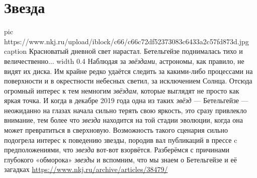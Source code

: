  
 
 
 
 
\chapter{Звезда}
\label{sec:slova.zvezda}

\ifcmt
  pic https://www.nkj.ru/upload/iblock/c66/c66c72df52373083c6433a2c57fd873d.jpg
	caption Красноватый дневной свет нарастал. Бетельгейзе поднималась тихо и величественно... 
	width 0.4
\fi
Наблюдая за \emph{звёздами}, астрономы, как правило, не видят их диска. Им
крайне редко удаётся следить за какими-либо процессами на поверхности и в
окрестности небесных светил, за исключением Солнца. Отсюда огромный интерес к
тем немногим \emph{звёздам}, которые выглядят не просто как яркая точка. И
когда в декабре 2019 года одна из таких \emph{звёзд} — Бетельгейзе — неожиданно
на глазах начала сильно терять свою яркость, это сразу привлекло внимание, тем
более что \emph{звезда} находится на той стадии эволюции, когда она может
превратиться в сверхновую. Возможность такого сценария сильно подогрела интерес
к поведению звезды, породив вал публикаций в прессе c предположениями, что
\emph{звезда} вот-вот взорвётся.  Разберёмся с причинами глубокого «обморока»
\emph{звезды} и вспомним, что мы знаем о Бетельгейзе и её загадках
\url{https://www.nkj.ru/archive/articles/38479/}


